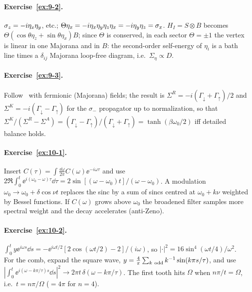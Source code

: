 \paragraph{Exercise~\ref{ex:9-2}.}
$\sigma_z=-i\eta_x\eta_y$, etc.; $\Theta\eta_x=-i\eta_x\eta_y\eta_z\eta_x=-i\eta_y\eta_z=\sigma_x$.
$H_I=S\otimes B$ becomes $\Theta(\cos\theta\eta_z+\sin\theta\eta_x)B$; since $\Theta$ is conserved, in each sector $\Theta=\pm1$ the vertex is linear in one Majorana and in $B$: the second-order self-energy of $\eta_i$ is a bath line times a $\delta_{ij}$ Majorana loop-free diagram, i.e.\ $\Sigma_{\eta}\propto D$.

\paragraph{Exercise~\ref{ex:9-3}.}
Follow~\cite[Sec.~2]{Sieberer2016} with fermionic (Majorana) fields; the result is $\Sigma^R=-i(\Gamma_\downarrow+\Gamma_\uparrow)/2$ and $\Sigma^K=-i(\Gamma_\downarrow-\Gamma_\uparrow)$ for the $\sigma_-$ propagator up to normalization, so that $\Sigma^K/(\Sigma^R-\Sigma^A)=(\Gamma_\downarrow-\Gamma_\uparrow)/(\Gamma_\downarrow+\Gamma_\uparrow)=\tanh(\beta\omega_0/2)$ iff detailed balance holds.

\paragraph{Exercise~\ref{ex:10-1}.}
Insert $C(\tau)=\int\frac{\dd\omega}{2\pi}C(\omega)\ee^{-i\omega\tau}$ and use $2\Re\int_0^t\ee^{i(\omega_0-\omega)\tau}\dd\tau=2\sin[(\omega-\omega_0)t]/(\omega-\omega_0)$.
A modulation $\omega_0\to\omega_0+\delta\cos\nu t$ replaces the sinc by a sum of sincs centred at $\omega_0+k\nu$ weighted by Bessel functions.
If $C(\omega)$ grows above $\omega_0$ the broadened filter samples more spectral weight and the decay accelerates (anti-Zeno).

\paragraph{Exercise~\ref{ex:10-2}.}
$\int_0^ty\ee^{i\omega s}\dd s=-\ee^{i\omega t/2}[2\cos(\omega t/2)-2]/(i\omega)$, so $|\cdot|^2=16\sin^4(\omega t/4)/\omega^2$.
For the comb, expand the square wave, $y=\tfrac4\pi\sum_{k\ \rm odd}k^{-1}\sin(k\pi s/\tau)$, and use $|\int_0^t\ee^{i(\omega-k\pi/\tau)s}\dd s|^2\to2\pi t\,\delta(\omega-k\pi/\tau)$.
The first tooth hits $\Omega$ when $n\pi/t=\Omega$, i.e.\ $t=n\pi/\Omega$ ($=4\pi$ for $n=4$).

